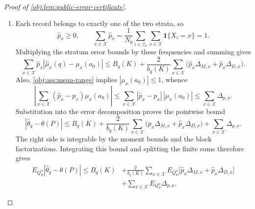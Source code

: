 \begin{proof}[Proof of \cref{obj:lem:public-error-certificate}]
\begin{enumerate}
\item
Each record belongs to exactly one of the two strata, so
\[
\widehat p_x\ge0,
\qquad
\sum_{x\in\mathcal X}\widehat p_x
=\frac1{N_0}\sum_{i\in\mathcal I_0}
       \sum_{x\in\mathcal X}\mathbf1\{X_i=x\}
=1.
\]
Multiplying the stratum error bounds by these frequencies and summing
gives
\[
\sum_{x\in\mathcal X}\widehat p_x
       |\widehat\mu_x(q)-\mu_x(a_0)|
\le
B_q(K)+\frac2{b_q(K)}\sum_{x\in\mathcal X}
       \bigl(\widehat p_x\Delta_{M,x}
             +\widehat p_x\Delta_{D,x}\bigr).
\]
Also, \cref{obj:ass:mean-range} implies
\(|\mu_x(a_0)|\le1\), whence
\[
\left|\sum_{x\in\mathcal X}(\widehat p_x-p_x)\mu_x(a_0)\right|
\le\sum_{x\in\mathcal X}|\widehat p_x-p_x|\,|\mu_x(a_0)|
\le\sum_{x\in\mathcal X}\Delta_{p,x}.
\]
Substitution into the error decomposition proves the pointwise bound
\[
|\widehat\theta_q-\theta(P)|
\le
B_q(K)+\frac2{b_q(K)}\sum_{x\in\mathcal X}
       \bigl(\widehat p_x\Delta_{M,x}
             +\widehat p_x\Delta_{D,x}\bigr)
+\sum_{x\in\mathcal X}\Delta_{p,x}.
\]
The right side is integrable by the moment bounds and the block
factorizations. Integrating this bound and splitting the finite sums
therefore gives
\[
\begin{aligned}
E_{Q_P^n}|\widehat\theta_q-\theta(P)|
\le B_q(K)
&+\frac2{b_q(K)}\sum_{x\in\mathcal X}
 E_{Q_P^n}\bigl[\widehat p_x\Delta_{M,x}
                  +\widehat p_x\Delta_{D,x}\bigr]\\
&+\sum_{x\in\mathcal X}E_{Q_P^n}\Delta_{p,x}.
\end{aligned}
\]


\end{enumerate}
\end{proof}
